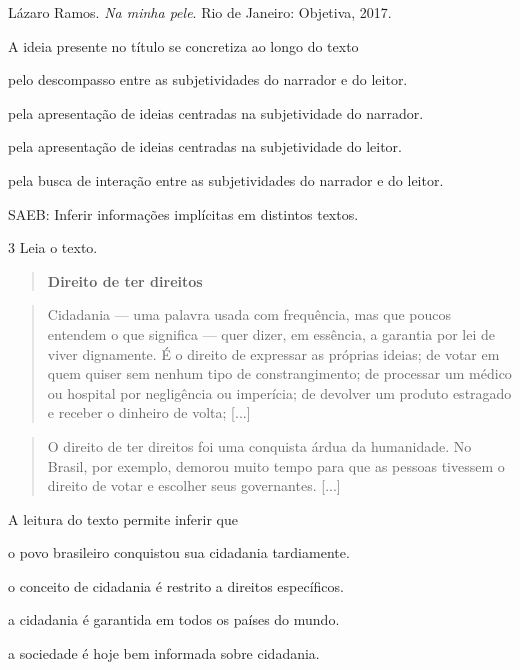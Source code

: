 Lázaro Ramos. \emph{Na minha pele}. Rio de Janeiro: Objetiva, 2017.

A ideia presente no título se concretiza ao longo do texto

\begin{escolha}
\item pelo descompasso entre as subjetividades do narrador e do leitor.

\item pela apresentação de ideias centradas na subjetividade do narrador.

\item pela apresentação de ideias centradas na subjetividade do leitor.

\item pela busca de interação entre as subjetividades do narrador e do
leitor.
\end{escolha}

SAEB: Inferir informações implícitas em distintos textos.

\num{3} Leia o texto.

\begin{quote}
\textbf{Direito de ter direitos}
\end{quote}

\begin{quote}
Cidadania --- uma palavra usada com frequência, mas que poucos entendem
o que significa --- quer dizer, em essência, a garantia por lei de viver
dignamente. É o direito de expressar as próprias ideias; de votar em
quem quiser sem nenhum tipo de constrangimento; de processar um médico
ou hospital por negligência ou imperícia; de devolver um produto
estragado e receber o dinheiro de volta; {[}...{]}
\end{quote}

\begin{quote}
O direito de ter direitos foi uma conquista árdua da humanidade. No
Brasil, por exemplo, demorou muito tempo para que as pessoas tivessem o
direito de votar e escolher seus governantes. {[}...{]}
\end{quote}


A leitura do texto permite inferir que

\begin{escolha}
\item o povo brasileiro conquistou sua cidadania tardiamente.

\item o conceito de cidadania é restrito a direitos específicos.

\item a cidadania é garantida em todos os países do mundo.

\item a sociedade é hoje bem informada sobre cidadania.
\end{escolha}

